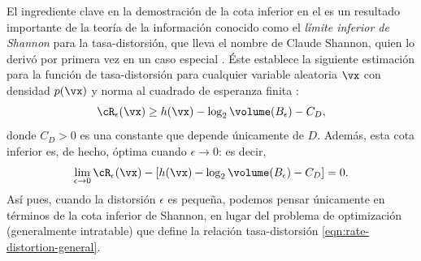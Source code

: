 \documentclass[../../book-main.tex]{subfiles}
\begin{document}
\begin{remark}\label{rem:slb}
    El ingrediente clave en la demostración de la cota inferior en el
     es un resultado importante de
    la teoría de la información conocido como el \textit{límite inferior de Shannon} para la 
    tasa-distorsión, que lleva el nombre de Claude Shannon, quien lo derivó por primera vez en un
    caso especial
    \cite{shannon1959coding}. Éste establece la siguiente estimación para la función de tasa-distorsión
    para cualquier variable aleatoria
    $\vx$ con
    densidad $p(\vx)$ y norma al cuadrado de esperanza finita \cite{Linder1994-ej}:
    \begin{equation}\label{eq:slb}
        \cR_{\epsilon}(\vx)
        \geq
        h(\vx)
        - \log_2 \volume(B_{\epsilon})
        -
        C_D,
    \end{equation}
    donde $C_D > 0$ es una constante que depende únicamente de $D$. Además,
    esta cota inferior
    es, de hecho, óptima cuando $\epsilon \to 0$: es decir,
    \begin{equation}
        \lim_{\epsilon \to 0} \cR_{\epsilon}(\vx) - \left[ h(\vx) - \log_2
        \volume(B_{\epsilon}) - C_D\right] = 0.
    \end{equation}
    Así pues, cuando la distorsión $\epsilon$ es pequeña, podemos pensar únicamente en términos de la
    cota inferior de Shannon, en lugar del problema de optimización (generalmente intratable)
    que define la relación tasa-distorsión
    \eqref{eqn:rate-distortion-general}.


\end{remark}
\end{document}
